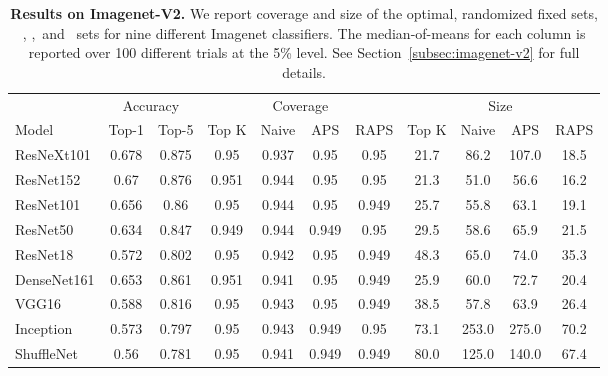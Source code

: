 \begin{table}[t] 
\centering 
\small 
\begin{tabular}{lcccccccccc} 
\toprule 
 & \multicolumn{2}{c}{Accuracy}  & \multicolumn{4}{c}{Coverage} & \multicolumn{4}{c}{Size} \\ 
\cmidrule(r){2-3}  \cmidrule(r){4-7}  \cmidrule(r){8-11} 
Model & Top-1 & Top-5 & Top K & Naive & APS & RAPS & Top K & Naive & APS & RAPS \\ 
\midrule 
 ResNeXt101 &  0.678 &  0.875 & 0.95 & 0.937 & 0.95 & 0.95 & 21.7 & 86.2 & 107.0 & 18.5 \\ 
 ResNet152 &  0.67 &  0.876 & 0.951 & 0.944 & 0.95 & 0.95 & 21.3 & 51.0 & 56.6 & 16.2 \\ 
 ResNet101 &  0.656 &  0.86 & 0.95 & 0.944 & 0.95 & 0.949 & 25.7 & 55.8 & 63.1 & 19.1 \\ 
 ResNet50 &  0.634 &  0.847 & 0.949 & 0.944 & 0.949 & 0.95 & 29.5 & 58.6 & 65.9 & 21.5 \\ 
 ResNet18 &  0.572 &  0.802 & 0.95 & 0.942 & 0.95 & 0.949 & 48.3 & 65.0 & 74.0 & 35.3 \\ 
 DenseNet161 &  0.653 &  0.861 & 0.951 & 0.941 & 0.95 & 0.949 & 25.9 & 60.0 & 72.7 & 20.4 \\ 
 VGG16 &  0.588 &  0.816 & 0.95 & 0.943 & 0.95 & 0.949 & 38.5 & 57.8 & 63.9 & 26.4 \\ 
 Inception &  0.573 &  0.797 & 0.95 & 0.943 & 0.949 & 0.95 & 73.1 & 253.0 & 275.0 & 70.2 \\ 
 ShuffleNet &  0.56 &  0.781 & 0.95 & 0.941 & 0.949 & 0.949 & 80.0 & 125.0 & 140.0 & 67.4 \\ 
\bottomrule 
\end{tabular} 
\caption{\textbf{Results on Imagenet-V2.} We report coverage and size of the optimal, randomized fixed sets, \naive, \aps,\ and \raps\ sets for nine different Imagenet classifiers. The median-of-means for each column is reported over 100 different trials at the 5\% level. See Section~\ref{subsec:imagenet-v2} for full details.} 
\label{table:imagenet-v2-005} 
\end{table} 
